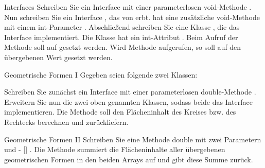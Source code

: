 \documentclass{../preamble}
\begin{document}
\clearpage

\begin{task}[credit = \stars{1}{3}]{Interfaces}
    Schreiben Sie ein Interface  mit einer parameterlosen \textcolor{keywordcolor}{void}-Methode . Nun schreiben Sie ein Interface , das von  erbt.  hat eine zusätzliche \textcolor{keywordcolor}{void}-Methode  mit einem \textcolor{keywordcolor}{int}-Parameter . Abschließend schreiben Sie eine Klasse , die das Interface  implementiert. Die Klasse hat ein \textcolor{keywordcolor}{int}-Attribut . Beim Aufruf der Methode  soll  auf  gesetzt werden. Wird Methode  aufgerufen, so soll  auf den übergebenen Wert gesetzt werden.


    \begin{solution}
        
    \end{solution}
\end{task}

\clearpage

\begin{task}[credit = \stars{1}{3}]{Geometrische Formen I}
    Gegeben seien folgende zwei Klassen:
    
    Schreiben Sie zunächst ein Interface  mit einer parameterlosen \textcolor{keywordcolor}{double}-Methode . Erweitern Sie nun die zwei oben genannten Klassen, sodass beide das Interface  implementieren. Die Methode  soll den Flächeninhalt des Kreises bzw. des Rechtecks berechnen und zurückliefern.

    \begin{solution}
        
    \end{solution}
\end{task}

\clearpage

\begin{task}[credit = \stars{1}{3}]{Geometrische Formen II}
    Schreiben Sie eine Methode \textcolor{keywordcolor}{double}  mit zwei Parametern   und  -
    \newline
     [] . Die Methode summiert die Flächeninhalte aller übergebenen  geometrischen Formen in den beiden Arrays auf und gibt  diese Summe zurück.

    \begin{solution}
        
    \end{solution}
\end{task}
\end{document}
